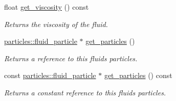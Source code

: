 \begin{DoxyCompactItemize}
float \hyperlink{classphysim_1_1fluids_1_1fluid_a047fcfcc2df0d02e3c2bb2ae50659e21}{get\+\_\+viscosity} () const
\begin{DoxyCompactList}\small\item\em Returns the viscosity of the fluid. \end{DoxyCompactList}\item 
\mbox{\label{classphysim_1_1fluids_1_1fluid_a4f55eb4ebc2bb422b237b79613c33982}} 
\hyperlink{classphysim_1_1particles_1_1fluid__particle}{particles\+::fluid\+\_\+particle} $\ast$ \hyperlink{classphysim_1_1fluids_1_1fluid_a4f55eb4ebc2bb422b237b79613c33982}{get\+\_\+particles} ()
\begin{DoxyCompactList}\small\item\em Returns a reference to this fluid\textquotesingle{}s particles. \end{DoxyCompactList}\item 
\mbox{\label{classphysim_1_1fluids_1_1fluid_ae8ca8c756706dcc2e41307eb118ee2a5}} 
const \hyperlink{classphysim_1_1particles_1_1fluid__particle}{particles\+::fluid\+\_\+particle} $\ast$ \hyperlink{classphysim_1_1fluids_1_1fluid_ae8ca8c756706dcc2e41307eb118ee2a5}{get\+\_\+particles} () const
\begin{DoxyCompactList}\small\item\em Returns a constant reference to this fluid\textquotesingle{}s particles. \end{DoxyCompactList}\end{DoxyCompactItemize}

